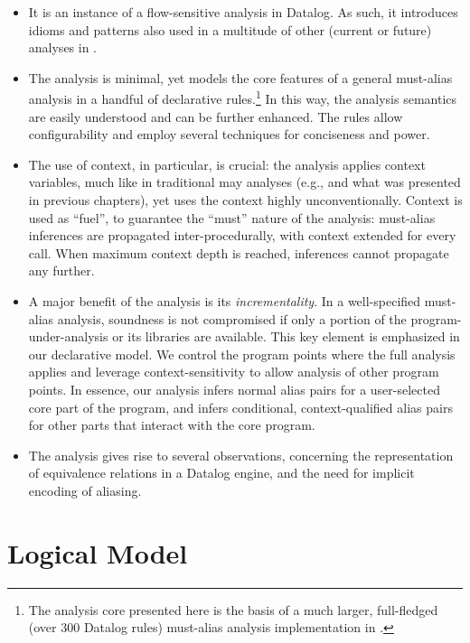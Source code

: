 \begin{itemize}
\item It is an instance of a flow-sensitive analysis in Datalog. As such, it introduces idioms and patterns also used in a multitude of other (current or future) analyses in \doop{}.

\item The analysis is minimal, yet models the core features of a general must-alias analysis in a handful of declarative rules.\footnote{The analysis core presented here is the basis of a much larger, full-fledged (over 300 Datalog rules) must-alias analysis implementation in \doop{}.} In this way, the analysis semantics are easily understood and can be further enhanced. The rules allow configurability and employ several techniques for conciseness and power.

\item The use of context, in particular, is crucial: the analysis applies context variables, much like in traditional may analyses (e.g., \cite{pldi:2013:Kastrinis,article:2015:Smaragdakis} and what was presented in previous chapters), yet uses the context highly unconventionally. Context is used as ``fuel'', to guarantee the ``must'' nature of the analysis: must-alias inferences are propagated inter-procedurally, with context extended for every call. When maximum context depth is reached, inferences cannot propagate any further.

\item A major benefit of the analysis is its \emph{incrementality}. In a well-specified must-alias analysis, soundness is not compromised if only a portion of the program-under-analysis or its libraries are available. This key element is emphasized in our declarative model. We control the program points where the full analysis applies and leverage context-sensitivity to allow analysis of other program points. In essence, our analysis infers normal alias pairs for a user-selected core part of the program, and infers conditional, context-qualified alias pairs for other parts that interact with the core program.

\item The analysis gives rise to several observations, concerning the representation of equivalence relations in a Datalog engine, and the need for implicit encoding of aliasing.

\end{itemize}


\section{Logical Model}
\label{sec:must-logic:model}

